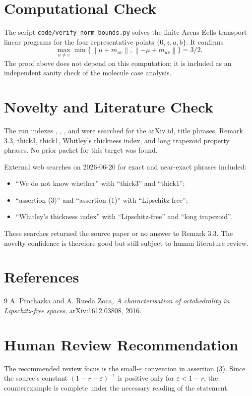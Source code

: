 \documentclass[11pt]{article}
\newcommand{\norm}[1]{\left\lVert #1\right\rVert}
\begin{document}
\section*{Computational Check}

The script \texttt{code/verify\_norm\_bounds.py} solves the finite
Arens-Eells transport linear programs for the four representative points
\(\{0,z,a,b\}\). It confirms
\[
 \max_{u\ne v}\min\{\norm{\mu+m_{uv}},\norm{-\mu+m_{uv}}\}=3/2.
\]
The proof above does not depend on this computation; it is included as an
independent sanity check of the molecule case analysis.

\section*{Novelty and Literature Check}

The run indexes , ,
, and  were searched for
the arXiv id, title phrases, Remark 3.3, thick3, thick1, Whitley's thickness
index, and long trapezoid property phrases. No prior packet for this target
was found.

External web searches on 2026-06-20 for exact and near-exact phrases included:
\begin{itemize}
\item ``We do not know whether'' with ``thick3'' and ``thick1'';
\item ``assertion (3)'' and ``assertion (1)'' with ``Lipschitz-free'';
\item ``Whitley's thickness index'' with ``Lipschitz-free'' and ``long trapezoid''.
\end{itemize}
These searches returned the source paper or no answer to Remark 3.3. The
novelty confidence is therefore good but still subject to human literature
review.

\section*{References}

\begin{thebibliography}{9}
A. Prochazka and A. Rueda Zoca,
\emph{A characterisation of octahedrality in Lipschitz-free spaces},
arXiv:1612.03808, 2016.
\end{thebibliography}

\section*{Human Review Recommendation}

The recommended review focus is the small-\(\varepsilon\) convention in
assertion (3). Since the source's constant \((1-r-\varepsilon)^{-1}\) is
positive only for \(\varepsilon<1-r\), the counterexample is complete under
the necessary reading of the statement.
\end{document}
